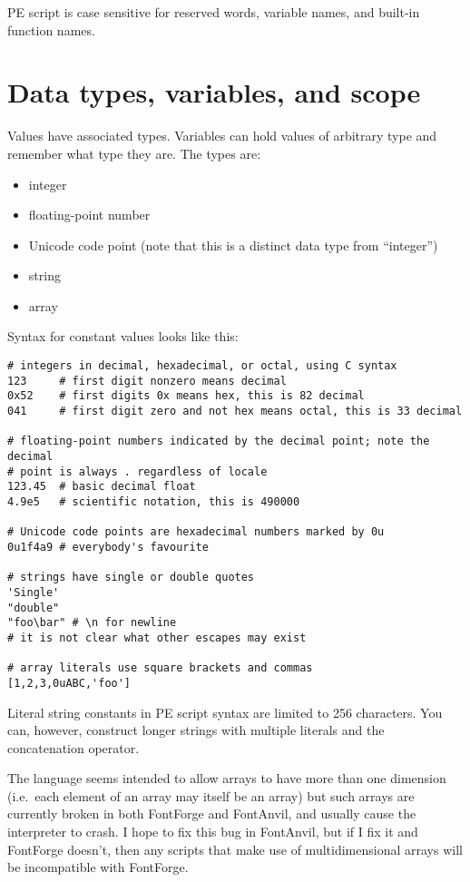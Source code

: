 \begin{framed}
PE script is case sensitive for reserved words, variable names,
and built-in function names.
\end{framed}

\section{Data types, variables, and scope}

Values have associated types.  Variables can hold values of arbitrary type
and remember what type they are.  The types are:
\begin{itemize}
\item integer
\item floating-point number
\item Unicode code point (note that this is a distinct data type from
``integer'')
\item string
\item array
\end{itemize}

Syntax for constant values looks like this:
\begin{verbatim}
# integers in decimal, hexadecimal, or octal, using C syntax
123     # first digit nonzero means decimal
0x52    # first digits 0x means hex, this is 82 decimal
041     # first digit zero and not hex means octal, this is 33 decimal

# floating-point numbers indicated by the decimal point; note the decimal
# point is always . regardless of locale
123.45  # basic decimal float
4.9e5   # scientific notation, this is 490000

# Unicode code points are hexadecimal numbers marked by 0u
0u1f4a9 # everybody's favourite

# strings have single or double quotes
'Single'
"double"
"foo\bar" # \n for newline
# it is not clear what other escapes may exist

# array literals use square brackets and commas
[1,2,3,0uABC,'foo']
\end{verbatim}

\begin{framed}
Literal string constants in PE script syntax are limited to 256 characters. 
You can, however, construct longer strings with multiple literals and the
concatenation operator.
\end{framed}

\begin{framed}
The language seems intended to allow arrays to have more than one dimension
(i.e.\ each element of an array may itself be an array) but such arrays are
currently broken in both FontForge and FontAnvil, and usually cause the
interpreter to crash.  I hope to fix this bug in FontAnvil, but if I fix it
and FontForge doesn't, then any scripts that make use of multidimensional
arrays will be incompatible with FontForge.
\end{framed}

